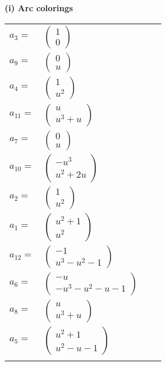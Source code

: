 \documentclass[1p]{elsarticle_modified}
\theoremstyle{definition}
\begin{document}
\flushleft \textbf{(i) Arc colorings}\\
\begin{tabular}{m{7pt} m{180pt} m{7pt} m{180pt} }
\flushright $a_{3}=$&$\begin{pmatrix}1\\0\end{pmatrix}$ \\
\flushright $a_{9}=$&$\begin{pmatrix}0\\u\end{pmatrix}$ \\
\flushright $a_{4}=$&$\begin{pmatrix}1\\u^2\end{pmatrix}$ \\
\flushright $a_{11}=$&$\begin{pmatrix}u\\u^3+u\end{pmatrix}$ \\
\flushright $a_{7}=$&$\begin{pmatrix}0\\u\end{pmatrix}$ \\
\flushright $a_{10}=$&$\begin{pmatrix}- u^3\\u^2+2 u\end{pmatrix}$ \\
\flushright $a_{2}=$&$\begin{pmatrix}1\\u^2\end{pmatrix}$ \\
\flushright $a_{1}=$&$\begin{pmatrix}u^2+1\\u^2\end{pmatrix}$ \\
\flushright $a_{12}=$&$\begin{pmatrix}-1\\u^3- u^2-1\end{pmatrix}$ \\
\flushright $a_{6}=$&$\begin{pmatrix}- u\\- u^3- u^2- u-1\end{pmatrix}$ \\
\flushright $a_{8}=$&$\begin{pmatrix}u\\u^3+u\end{pmatrix}$ \\
\flushright $a_{5}=$&$\begin{pmatrix}u^2+1\\u^2- u-1\end{pmatrix}$\\&\end{tabular}
\end{document}
